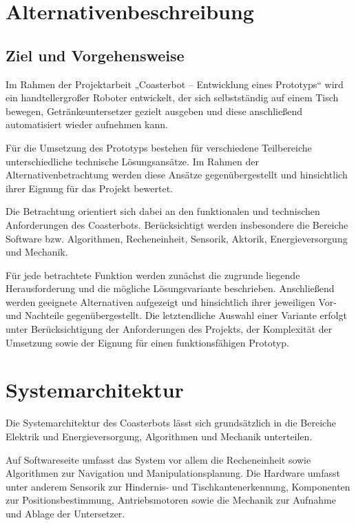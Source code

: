 \section{Alternativenbeschreibung}\label{alternativenbeschreibung}

\subsection{Ziel und Vorgehensweise}\label{ziel-und-vorgehensweise}

Im Rahmen der Projektarbeit „Coasterbot -- Entwicklung eines Prototyps``
wird ein handtellergroßer Roboter entwickelt, der sich selbstständig auf
einem Tisch bewegen, Getränkeuntersetzer gezielt ausgeben und diese
anschließend automatisiert wieder aufnehmen kann.

Für die Umsetzung des Prototyps bestehen für verschiedene Teilbereiche
unterschiedliche technische Lösungsansätze. Im Rahmen der
Alternativenbetrachtung werden diese Ansätze gegenübergestellt und
hinsichtlich ihrer Eignung für das Projekt bewertet.

Die Betrachtung orientiert sich dabei an den funktionalen und
technischen Anforderungen des Coasterbots. Berücksichtigt werden
insbesondere die Bereiche Software bzw. Algorithmen, Recheneinheit,
Sensorik, Aktorik, Energieversorgung und Mechanik.

Für jede betrachtete Funktion werden zunächst die zugrunde liegende
Herausforderung und die mögliche Lösungsvariante beschrieben.
Anschließend werden geeignete Alternativen aufgezeigt und hinsichtlich
ihrer jeweiligen Vor- und Nachteile gegenübergestellt. Die letztendliche
Auswahl einer Variante erfolgt unter Berücksichtigung der Anforderungen
des Projekts, der Komplexität der Umsetzung sowie der Eignung für einen
funktionsfähigen Prototyp.

\section{Systemarchitektur}\label{systemarchitektur}

Die Systemarchitektur des Coasterbots lässt sich grundsätzlich in die
Bereiche Elektrik und Energieversorgung, Algorithmen und Mechanik
unterteilen.

Auf Softwareseite umfasst das System vor allem die Recheneinheit sowie
Algorithmen zur Navigation und Manipulationsplanung. Die Hardware
umfasst unter anderem Sensorik zur Hindernis- und Tischkantenerkennung,
Komponenten zur Positionsbestimmung, Antriebsmotoren sowie die Mechanik
zur Aufnahme und Ablage der Untersetzer.

